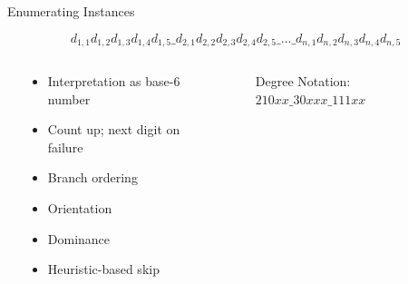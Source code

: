 \documentclass[aspectratio=169,notes]{beamer}
\begin{document}
\begin{frame}{Enumerating Instances}

$$d_{1,1}d_{1,2}d_{1,3}d_{1,4}d_{1,5}\_d_{2,1}d_{2,2}d_{2,3}d_{2,4}d_{2,5}\_\ldots\_d_{n,1}d_{n,2}d_{n,3}d_{n,4}d_{n,5}$$

\begin{columns}
\begin{column}{0.01\textwidth}
\end{column}
\begin{column}{0.4\textwidth}
    \begin{itemize}
    \item Interpretation as base-6 number
    \item Count up; next digit on failure
    \item Branch ordering
    \item Orientation
    \item Dominance
    \item Heuristic-based skip
    \end{itemize}
\end{column}
\begin{column}{0.57\textwidth}
\begin{figure}
    \centering
    \caption*{Degree Notation: $210xx\_30xxx\_111xx$}
\end{figure}
\end{column}
\end{columns}

\end{frame}
\end{document}
